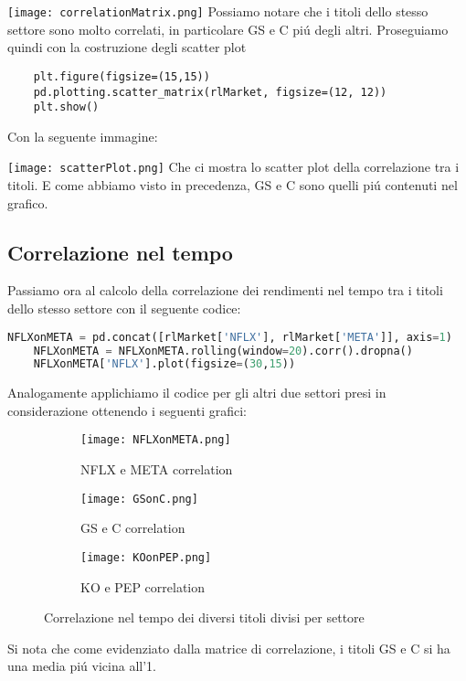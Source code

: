 \documentclass{report}
\begin{document}
\texttt{[image: correlationMatrix.png]}
Possiamo notare che i titoli dello stesso settore sono molto correlati, in particolare GS e C piú degli altri.
Proseguiamo quindi con la costruzione degli scatter plot
\begin{lstlisting}
    plt.figure(figsize=(15,15))
    pd.plotting.scatter_matrix(rlMarket, figsize=(12, 12))
    plt.show()
\end{lstlisting}
Con la seguente immagine:

\texttt{[image: scatterPlot.png]}
Che ci mostra lo scatter plot della correlazione tra i titoli. E come abbiamo visto in precedenza, GS e C sono quelli piú contenuti nel grafico.

\subsection{Correlazione nel tempo}
Passiamo ora al calcolo della correlazione dei rendimenti nel tempo tra i titoli dello stesso settore con il seguente codice:
\begin{lstlisting}[language=python]
    NFLXonMETA = pd.concat([rlMarket['NFLX'], rlMarket['META']], axis=1)
    NFLXonMETA = NFLXonMETA.rolling(window=20).corr().dropna()
    NFLXonMETA['NFLX'].plot(figsize=(30,15))
\end{lstlisting}
Analogamente applichiamo il codice per gli altri due settori presi in considerazione ottenendo i seguenti grafici:\newpage
\begin{figure}[h]

\begin{subfigure}{0.5\textwidth}
\texttt{[image: NFLXonMETA.png]} 
\caption{NFLX e META correlation}
\label{fig:subim1}
\end{subfigure}
\begin{subfigure}{0.5\textwidth}
\texttt{[image: GSonC.png]}
\caption{GS e C correlation}
\label{fig:subim2}
\end{subfigure}
\begin{subfigure}{0.5\textwidth}
\texttt{[image: KOonPEP.png]}
\caption{KO e PEP correlation}
\label{fig:subim3}
\end{subfigure}

\caption{Correlazione nel tempo dei diversi titoli divisi per settore}
\label{fig:image2}
\end{figure}

 Si nota che come evidenziato dalla matrice di correlazione, i titoli GS e C si ha una media piú vicina all'1.
 
\end{document}
